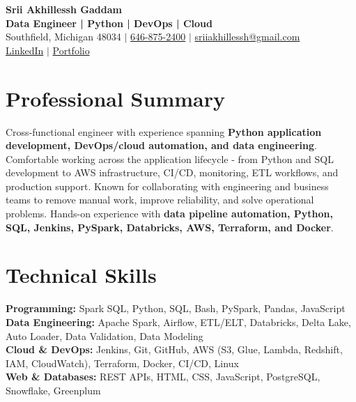 \documentclass[letterpaper,10pt]{article}
\begin{document}
\fontsize{9.35pt}{10.45pt}\selectfont

\begin{center}
    {\LARGE \textbf{Srii Akhillessh Gaddam}} \\[-1pt]
    \textbf{Data Engineer | Python | DevOps | Cloud} \\[2pt]
    Southfield, Michigan 48034 $|$
    \href{tel:6468752400}{646-875-2400} $|$
    \href{mailto:sriiakhillessh@gmail.com}{sriiakhillessh@gmail.com} \\[1pt]
    \href{https://www.linkedin.com/in/srii-akhiilessh-gaddam-b48668191/}{LinkedIn} $|$
    \href{https://sriiakhillesshg.github.io/portfolio/}{Portfolio}
\end{center}
\vspace{-8pt}

\section{Professional Summary}
\small{Cross-functional engineer with experience spanning \textbf{Python application development, DevOps/cloud automation, and data engineering}. Comfortable working across the application lifecycle - from Python and SQL development to AWS infrastructure, CI/CD, monitoring, ETL workflows, and production support. Known for collaborating with engineering and business teams to remove manual work, improve reliability, and solve operational problems. Hands-on experience with \textbf{data pipeline automation, Python, SQL, Jenkins, PySpark, Databricks, AWS, Terraform, and Docker}.}

\section{Technical Skills}
\small{
\textbf{Programming:} Spark SQL, Python, SQL, Bash, PySpark, Pandas, JavaScript \\
\textbf{Data Engineering:} Apache Spark, Airflow, ETL/ELT, Databricks, Delta Lake, Auto Loader, Data Validation, Data Modeling \\
\textbf{Cloud \& DevOps:} Jenkins, Git, GitHub, AWS (S3, Glue, Lambda, Redshift, IAM, CloudWatch), Terraform, Docker, CI/CD, Linux \\
\textbf{Web \& Databases:} REST APIs, HTML, CSS, JavaScript, PostgreSQL, Snowflake, Greenplum
}

\end{document}
